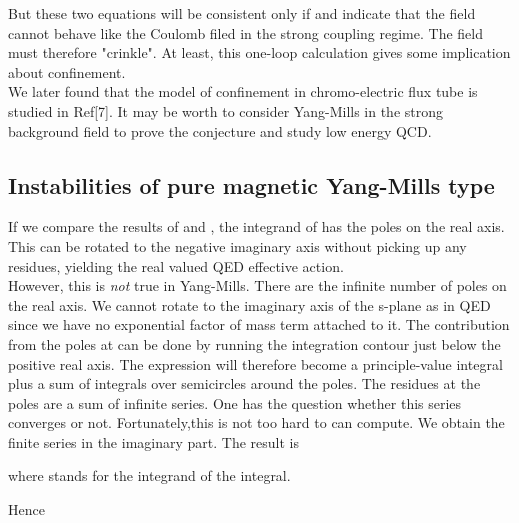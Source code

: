 \documentclass[a4paper,12 pt]{article}
\begin{document}
\begin{center}
\coordHE{}
\end{center}
But these two equations will be consistent only if \coordHE{} and indicate that the field cannot behave like the Coulomb
filed in the strong coupling regime. The field must therefore
"crinkle". At least, this one-loop calculation gives some
implication about
confinement.\\
We later found that the model of confinement in chromo-electric
flux tube is studied in Ref[7]. It may be worth to consider
Yang-Mills in the strong background field to prove the conjecture
and study low energy QCD.

\subsection{Instabilities of pure magnetic Yang-Mills type}
If we compare the results of \coordHE{} and \coordHE{},
the integrand of \coordHE{} has the poles on the real axis.
This can be rotated to the negative imaginary axis without picking
up any residues, yielding the real valued QED effective action.\\
However, this is \emph{not} true in Yang-Mills. There are  the
infinite number of poles on the real axis. We cannot rotate to the
imaginary axis of the s-plane as in QED since we have no
exponential factor of mass term attached to it. The contribution
from the poles at \coordHE{} can be
done by running the integration contour just below the positive
real axis. The expression \coordHE{} will therefore become a
principle-value integral plus a sum of integrals over semicircles
around the poles. The residues at the poles are a sum of infinite
series. One has the question whether this series converges or not.
Fortunately,this is not too hard to can compute. We obtain the
finite series in the imaginary part. The result is
\begin{center}
\coordHE{}

\end{center}
where \myHighlight{$[...]$}\coordHE{} stands for the integrand of the integral.
\begin{center}
\coordHE{}
\end{center}
\begin{center}
\coordHE{}
\end{center}
Hence
\end{document}
